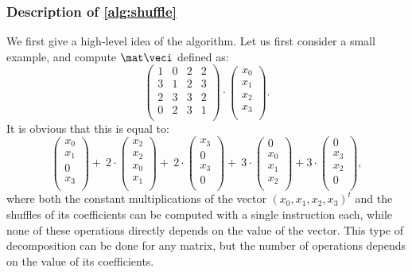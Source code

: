 \subsubsection{Description of \autoref{alg:shuffle}}
We first give a high-level idea of the algorithm.
Let us first consider a small example, and compute $\mat\veci$ defined as:
\begin{equation}
\label{matey}
	\begin{pmatrix}
	    1 & 0 & 2 & 2 \\
		3 & 1 & 2 & 3 \\
		2 & 3 & 3 & 2 \\
		0 & 2 & 3 & 1 \\
	\end{pmatrix}\cdot
	\begin{pmatrix}
	x_0 \\
	x_1 \\
	x_2 \\
	x_3 \\
	\end{pmatrix}.
\end{equation}
It is obvious that this is equal to:
\[
	\begin{pmatrix}
	x_0 \\
	x_1 \\
	0 \\
	x_3 \\
	\end{pmatrix}
	+~
	2\cdot
	\begin{pmatrix}
	x_2 \\
	x_2 \\
	x_0 \\
	x_1 \\
	\end{pmatrix}
	+~
	2\cdot
	\begin{pmatrix}
	x_3 \\
	0 \\
	x_3 \\
	0 \\
	\end{pmatrix}
	+~
	3\cdot
	\begin{pmatrix}
	0 \\
	x_0 \\
	x_1 \\
	x_2 \\
	\end{pmatrix}
	+
	3\cdot
	\begin{pmatrix}
	0 \\
	x_3 \\
	x_2 \\
	0 \\
	\end{pmatrix},
\]
where both the constant multiplications of the vector $(x_0, x_1, x_2, x_3)^t$ and the shuffles of its coefficients can be computed
with a single \pshufb{} instruction each, while none of these operations directly depends on the value of the vector.
This type of decomposition can be done for any matrix, but the number of operations depends on the value of its coefficients.

